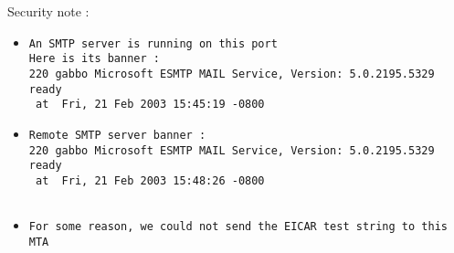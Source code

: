 \documentclass{article}
\begin{document}
Security note :\\
\begin{itemize}
\item \begin{verbatim}
An SMTP server is running on this port
Here is its banner : 
220 gabbo Microsoft ESMTP MAIL Service, Version: 5.0.2195.5329 ready
 at  Fri, 21 Feb 2003 15:45:19 -0800 
\end{verbatim}\item \begin{verbatim}
Remote SMTP server banner :
220 gabbo Microsoft ESMTP MAIL Service, Version: 5.0.2195.5329 ready
 at  Fri, 21 Feb 2003 15:48:26 -0800 


\end{verbatim}\item \begin{verbatim}
For some reason, we could not send the EICAR test string to this MTA
\end{verbatim}\end{itemize}
\end{document}
